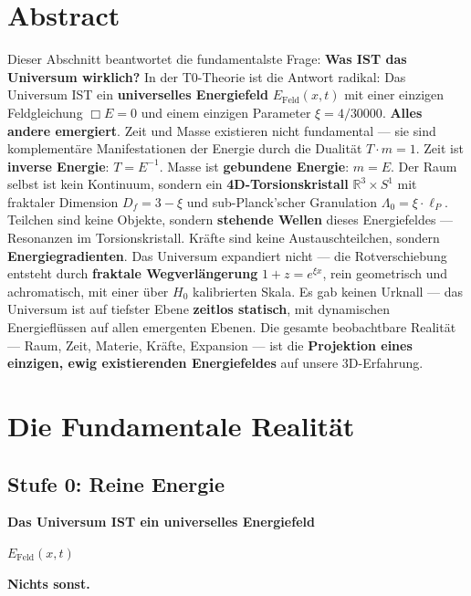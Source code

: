 \section*{Abstract}
		Dieser Abschnitt beantwortet die fundamentalste Frage: \textbf{Was IST das Universum wirklich?} In der T0-Theorie ist die Antwort radikal: Das Universum IST ein \textbf{universelles Energiefeld} $E_{\text{Feld}}(x,t)$ mit einer einzigen Feldgleichung $\Box E = 0$ und einem einzigen Parameter $\xi = 4/30000$. \textbf{Alles andere emergiert}. Zeit und Masse existieren nicht fundamental — sie sind komplementäre Manifestationen der Energie durch die Dualität $T \cdot m = 1$. Zeit ist \textbf{inverse Energie}: $T = E^{-1}$. Masse ist \textbf{gebundene Energie}: $m = E$. Der Raum selbst ist kein Kontinuum, sondern ein \textbf{4D-Torsionskristall} $\mathbb{R}^3 \times S^1$ mit fraktaler Dimension $D_f = 3-\xi$ und sub-Planck'scher Granulation $\Lambda_0 = \xi \cdot \ell_P$. Teilchen sind keine Objekte, sondern \textbf{stehende Wellen} dieses Energiefeldes — Resonanzen im Torsionskristall. Kräfte sind keine Austauschteilchen, sondern \textbf{Energiegradienten}. Das Universum expandiert nicht — die Rotverschiebung entsteht durch \textbf{fraktale Wegverlängerung} $1+z = e^{\xi x}$, rein geometrisch und achromatisch, mit einer über $H_0$ kalibrierten Skala. Es gab keinen Urknall — das Universum ist auf tiefster Ebene \textbf{zeitlos statisch}, mit dynamischen Energieflüssen auf allen emergenten Ebenen. Die gesamte beobachtbare Realität — Raum, Zeit, Materie, Kräfte, Expansion — ist die \textbf{Projektion eines einzigen, ewig existierenden Energiefeldes} auf unsere 3D-Erfahrung.


	\section{Die Fundamentale Realität}

	\subsection{Stufe 0: Reine Energie}

	\begin{revolutionary}[Was das Universum IST]

		\begin{center}
			\textbf{Das Universum IST ein universelles Energiefeld}

			\vspace{0.3cm}

			$E_{\text{Feld}}(x,t)$

			\vspace{0.3cm}

			\textbf{Nichts sonst.}
		\end{center}
		\normalsize
	\end{revolutionary}

